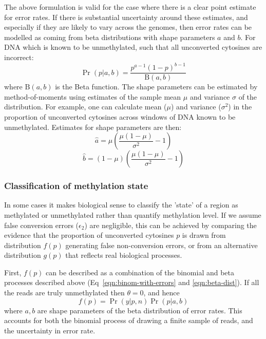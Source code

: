 \documentclass[10pt,letterpaper]{article}
\begin{document}
The above formulation is valid for the case where there is a clear point estimate for error rates.
If there is substantial uncertainty around these estimates, and especially if they are likely to vary across the genomes, then error rates can be modelled as coming from beta distributions with shape parameters $a$ and $b$. For DNA which is known to be unmethylated, such that all unconverted cytosines are incorrect:
\begin{equation}
    \label{eqn:beta-dist}
    \Pr(p|a,b) = \frac{p^{a-1} (1-p)^{b-1}}{\textrm{B}(a,b)}
\end{equation}
where $\textrm{B}(a,b)$ is the Beta function.
The shape parameters can be estimated by method-of-moments using estimates of the sample mean $\mu$ and variance $\sigma$ of the distribution.
For example, one can calculate mean ($\mu$) and variance ($\sigma^2$) in the proportion of unconverted cytosines across windows of DNA known to be unmethylated.
Estimates for shape parameters are then:
\begin{equation}
    \hat{a} = \mu(\frac{\mu(1-\mu)}{\sigma^2}-1)
    \label{eqn:beta-a}
\end{equation}
\begin{equation}
    \hat{b} = (1-\mu)(\frac{\mu(1-\mu)}{\sigma^2}-1) 
    \label{eqn:beta-b}
\end{equation}

\subsubsection*{Classification of methylation state} \label{sec:meth-state}

In some cases it makes biological sense to classify the 'state' of a region as methylated or unmethylated rather than quantify methylation level.
If we assume false conversion errors ($\epsilon_2$) are negligible, this can be achieved by comparing the evidence that the proportion of unconverted cytosines $p$ is drawn from distribution $f(p)$ generating false non-conversion errors, or from an alternative distribution $g(p)$ that reflects real biological processes.

First, $f(p)$ can be described as a combination of the binomial and beta processes described above (Eq~\ref{eqn:binom-with-errors} and \ref{eqn:beta-dist}).
If all the reads are truly unmethylated then $\theta=0$, and hence
\begin{equation}
    f(p) = \Pr(y | p, n) \Pr(p | a, b)
    \label{eqn:f-of-p}
\end{equation}
where $a, b$ are shape parameters of the beta distribution of error rates.
This accounts for both the binomial process of drawing a finite sample of reads, and the uncertainty in error rate.
\end{document}
